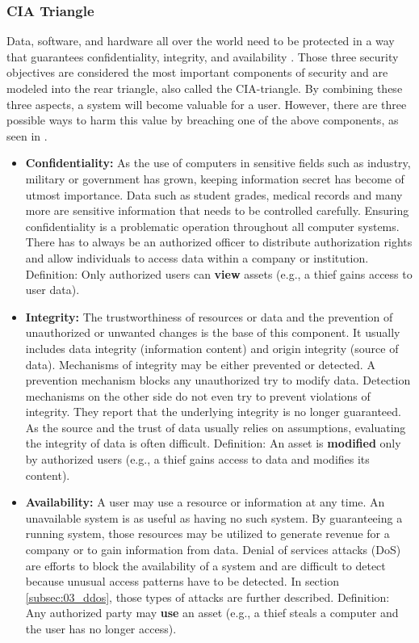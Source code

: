 \subsubsection{CIA Triangle}
Data, software, and hardware all over the world need to be protected in a way that guarantees confidentiality, integrity, and availability \cite{Pfleeger2014}. Those three security objectives are considered the most important components of security and are modeled into the rear triangle, also called the CIA-triangle. By combining these three aspects, a system will become valuable for a user. However, there are three possible ways to harm this value by breaching one of the above components, as seen in \cite{Bishop2004}.
\begin{itemize}
  \item \textbf{Confidentiality:} As the use of computers in sensitive fields such as industry, military or government has grown, keeping information secret has become of utmost importance. Data such as student grades, medical records and many more are sensitive information that needs to be controlled carefully. Ensuring confidentiality is a problematic operation throughout all computer systems. There has to always be an authorized officer to distribute  authorization rights and allow individuals to access data within a company or institution.
        \subitem Definition: Only authorized users can \textbf{view} assets (e.g., a thief gains access to user data).
  \item \textbf{Integrity:} The trustworthiness of resources or data and the prevention of unauthorized or unwanted changes is the base of this component. It usually includes data integrity (information content) and origin integrity (source of data). Mechanisms of integrity may be either prevented or detected. A prevention mechanism blocks any unauthorized try to modify data. Detection mechanisms on the other side do not even try to prevent violations of integrity. They report that the underlying integrity is no longer guaranteed. As the source and the trust of data usually relies on assumptions, evaluating the integrity of data is often difficult.
        \subitem Definition: An asset is \textbf{modified} only by authorized users (e.g., a thief gains access to data and modifies its content).
  \item \textbf{Availability:} A user may use a resource or information at any time. An unavailable system is as useful as having no such system. By guaranteeing a running system, those resources may be utilized to generate revenue for a company or to gain information from data. Denial of services attacks (DoS) are efforts to block the availability of a system and are difficult to detect because unusual access patterns have to be detected. In section \ref{subsec:03_ddos}, those types of attacks are further described.
        \subitem Definition: Any authorized party may \textbf{use} an asset (e.g., a thief steals a computer and the user has no longer access).
\end{itemize}

